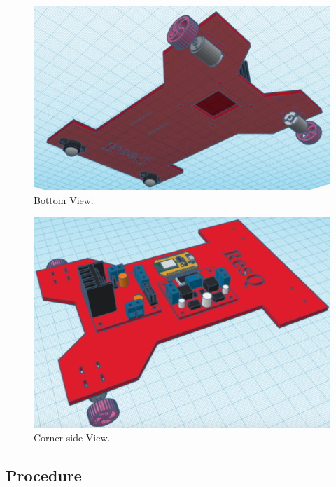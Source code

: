 \documentclass{Resources/UoBLab1}
\begin{document}
\vspace{3mm}
\begin{figure}
    \centering
    \includegraphics[width=\linewidth]{Resources/bottom}
    \caption{Bottom View.\cite{reference1}}
    \label{fig:my_label}
\end{figure}
\vspace{3mm}
\begin{figure}
    \centering
    \includegraphics[width=\linewidth]{Resources/corner}
    \caption{Corner side View.\cite{reference1}}
    \label{fig:my_label}
\end{figure}

\subsection{Procedure}
\end{document}
